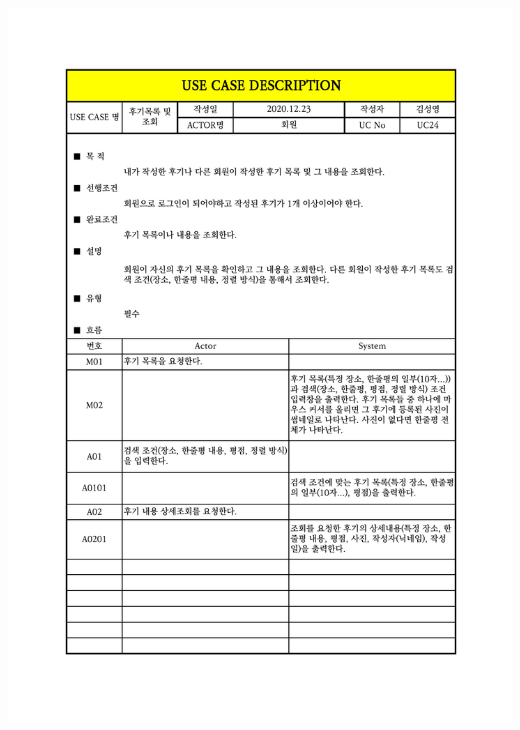 {{{{{{{{{{{{{{{{{{{{{{{{{{\includegraphics[width=1.1\textwidth]{./Figure/Design/Display/usecase/024.pdf} \\
}}}}}}}}}}}}}}}}}}}}}}}}}}

